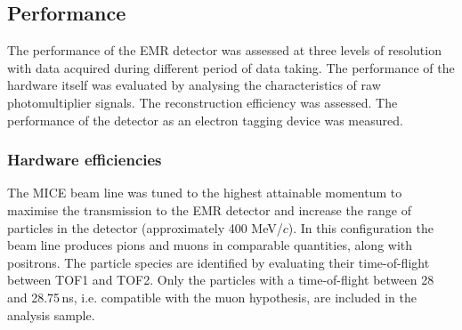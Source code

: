 \subsection{Performance}
\label{SubSect:EMR_Performance}

The performance of the EMR detector was assessed at three levels of resolution with data acquired during different period of data taking.
The performance of the hardware itself was evaluated by analysing the characteristics of raw photomultiplier signals. The reconstruction efficiency was assessed. The performance of the detector as an electron tagging device was measured.

\subsubsection{Hardware efficiencies}
The MICE beam line was tuned to the highest attainable momentum to maximise the transmission to the EMR detector and increase the range of particles in the detector (approximately 400 MeV/$c$). In this configuration the beam line produces pions and muons in comparable quantities, along with positrons. The particle species are identified by evaluating their time-of-flight between TOF1 and TOF2.
Only the particles with a time-of-flight between 28 and 28.75\,ns, i.e. compatible with the muon hypothesis, are included in the analysis sample.



